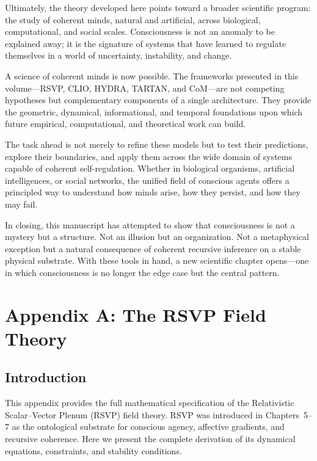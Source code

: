 \documentclass[12pt,oneside]{book}
\theoremstyle{plain}
\theoremstyle{definition}
\begin{document}
Ultimately, the theory developed here points toward a broader scientific
program: the study of coherent minds, natural and artificial, across
biological, computational, and social scales. Consciousness is not an anomaly
to be explained away; it is the signature of systems that have learned to
regulate themselves in a world of uncertainty, instability, and change.

A science of coherent minds is now possible. The frameworks presented in this
volume—RSVP, CLIO, HYDRA, TARTAN, and CoM—are not competing hypotheses but
complementary components of a single architecture. They provide the geometric,
dynamical, informational, and temporal foundations upon which future empirical,
computational, and theoretical work can build.

The task ahead is not merely to refine these models but to test their
predictions, explore their boundaries, and apply them across the wide domain of
systems capable of coherent self-regulation. Whether in biological organisms,
artificial intelligences, or social networks, the unified field of conscious
agents offers a principled way to understand how minds arise, how they persist,
and how they may fail.

In closing, this manuscript has attempted to show that consciousness is not a
mystery but a structure. Not an illusion but an organization. Not a metaphysical
exception but a natural consequence of coherent recursive inference on a
stable physical substrate. With these tools in hand, a new scientific chapter
opens—one in which consciousness is no longer the edge case but the central
pattern.

\newpage
\appendix

\chapter{Appendix A: The RSVP Field Theory}
\label{appendix:RSVP}

\section{Introduction}

This appendix provides the full mathematical specification of the
Relativistic Scalar--Vector Plenum (RSVP) field theory.
RSVP was introduced in Chapters~5--7 as the ontological substrate for
conscious agency, affective gradients, and recursive coherence.
Here we present the complete derivation of its dynamical equations,
constraints, and stability conditions.
\end{document}

